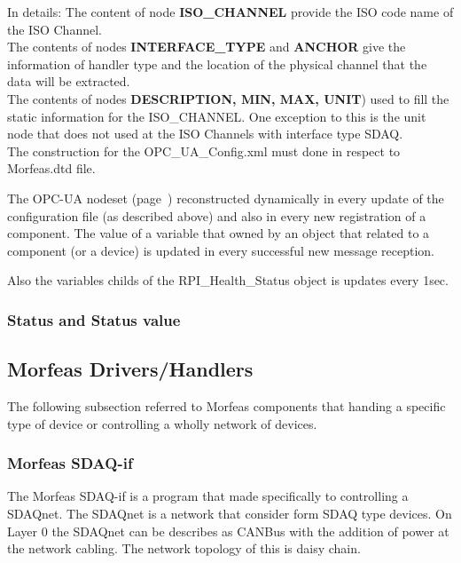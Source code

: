 \documentclass{article}
\begin{document}
In details:
The content of node \textbf{ISO\_CHANNEL} provide the ISO code name of the ISO Channel.\\
The contents of nodes \textbf{INTERFACE\_TYPE} and \textbf{ANCHOR} give the information of handler type and the location of the physical channel that the data will be extracted.\\
The contents of nodes \textbf{DESCRIPTION, MIN, MAX, UNIT}) used to fill the static information for the ISO\_CHANNEL. One exception to this is the unit node that does not used
at the ISO Channels with interface type SDAQ.\\
The construction for the OPC\_UA\_Config.xml must done in respect to Morfeas.dtd file.

The OPC-UA nodeset (page~\pageref{tree:OPC_UA_nodeset}) reconstructed dynamically in every update of the configuration file (as described above) and also in every new registration of a component.
The value of a variable that owned by an object that related to a component (or a device) is updated in every successful new message reception.

Also the variables childs of the RPI\_Health\_Status object is updates every 1sec.

\subsubsection{Status and Status value}

\newpage
\subsection{Morfeas Drivers/Handlers}
The following subsection referred to Morfeas components that handing a specific type of device or controlling a wholly network of devices.
\subsubsection{Morfeas SDAQ-if}
The Morfeas SDAQ-if is a program that made specifically to controlling a SDAQnet. The SDAQnet is a network that consider form SDAQ type devices.
On Layer 0 the SDAQnet can be describes as CANBus with the addition of power at the network cabling. The network topology of this is daisy chain.
\end{document}
